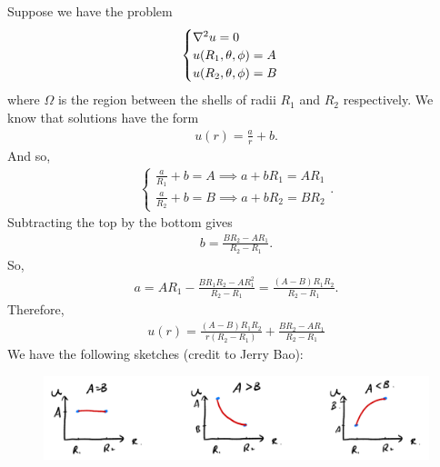 \documentclass{article}
\theoremstyle{definition}
\newcommand{\f}[2]{\frac{#1}{#2}}
\begin{document}
\begin{enumerate}
	Suppose we have the problem
	\begin{align*}
	\begin{cases}
	\laplacian u = 0\\
	u(R_1,\theta,\phi) = A\\
	u(R_2, \theta, \phi) = B
	\end{cases}
	\end{align*}
	where $\Omega$ is the region between the shells of radii $R_1$ and $R_2$ respectively. We know that solutions have the form 
	\begin{align*}
	u(r) = \f{a}{r} + b.
	\end{align*}
	And so,
	\begin{align*}
	\begin{cases}
	\f{a}{R_1} + b = A \implies a + bR_1 = AR_1\\
	\f{a}{R_2} + b = B \implies a + bR_2 = BR_2
	\end{cases}.
	\end{align*}
	Subtracting the top by the bottom gives
	\begin{align*}
	b = \f{BR_2 - AR_1}{R_2 - R_1}.
	\end{align*}
	So,
	\begin{align*}
	a = AR_1 - \f{BR_1R_2 - AR_1^2}{R_2 - R_1}   = \f{(A-B)R_1R_2}{R_2 - R_1}.
	\end{align*}
	Therefore,
	\begin{align*}
	\boxed{u(r) = \f{(A-B)R_1R_2}{r(R_2 - R_1)} + \f{BR_2 - AR_1}{R_2 - R_1}}
	\end{align*}
	We have the following sketches (credit to Jerry Bao):
	\begin{figure}[h!]
		\centering
		\includegraphics[scale=0.5]{u.png}
	\end{figure}





\end{enumerate}
\end{document}
